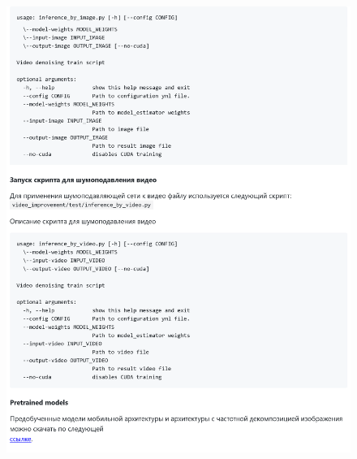 \documentclass[14pt]{mmcs_article}
\begin{document}
\begin{appendices}
\begin{figure}[h]
	\centering
	\includegraphics[width=\textwidth]{img/markdown/README_4}
	\label{fig:markdown_4}
\end{figure}
	
\end{appendices}
\end{document}
